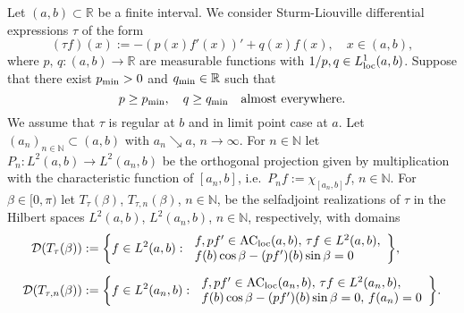 \documentclass[a4paper,reqno]{amsart}
\begin{document}
Let $(a,b)\subset{\mathbb{R}}$ be a finite interval.
We consider  {Sturm-Liouville differential expressions} $\tau$ of the form
$$(\tau f)(x):=-(p(x)f'(x))'+q(x)f(x), \quad x\in (a,b),$$
where $p,\,q:(a,b)\to{\mathbb{R}}$ are measurable functions with $1/p, q \in L^1_{\rm loc}(a,b)$. 
Suppose that there exist $p_{\rm min}>0$ and $q_{\rm min}\in{\mathbb{R}}$ such that $$p\geq p_{\rm min}, \quad q\geq q_{\rm min}\quad\text{almost everywhere.}$$
We assume that $\tau$ is regular at $b$ and in limit point case at $a$.
Let $(a_n)_{n\in{\mathbb{N}}}\subset(a,b)$ with 
$a_n\searrow a$, $n\to\infty$. For $n\in{\mathbb{N}}$ let $P_n:L^2(a,b)\to L^2(a_n,b)$ be the orthogonal projection given by multiplication with the characteristic function of $[a_n,b]$, i.e.\ $P_nf:=\chi_{[a_n,b]}f$, $n\in{\mathbb{N}}$.
For $\beta\in [0,\pi)$ let $T_{\tau}(\beta)$, $T_{\tau,n}(\beta)$, $n\in{\mathbb{N}}$, be the selfadjoint realizations of $\tau$ in the Hilbert spaces $L^2(a,b)$, $L^2(a_n,b)$, $n\in{\mathbb{N}}$, respectively, with domains
\begin{align*}
{\mathcal D}(T_{\tau}(\beta))&:=\bigg\{f\in L^2(a,b):\,\begin{array}{l}f,pf'\in{\rm AC_{loc}}(a,b),\, \tau f\in L^2(a,b),\\f(b)\cos\beta-(pf')(b)\sin\beta=0\end{array}\bigg\},\\[2mm]
{\mathcal D}(T_{\tau,n}(\beta))&:=\bigg\{f\in L^2(a_n,b):\,\begin{array}{l}f,pf'\in{\rm AC_{loc}}(a_n,b),\,\tau f\in L^2(a_n,b),\\f(b)\cos\beta-(pf')(b)\sin\beta=0,\,f(a_n)=0\end{array}\bigg\}.
\end{align*}
\end{document}
